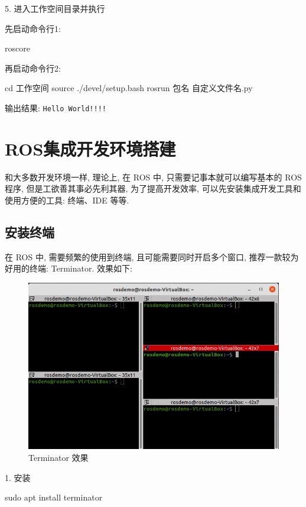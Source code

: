 \documentclass[openany, fontset=windowsold]{ctexbook}
\theoremstyle{kaiti}
\theoremstyle{normal}
\begin{document}
5. 进入工作空间目录并执行

先启动命令行1:

\begin{bash}
  roscore
\end{bash}

再启动命令行2:

\begin{bash}
  cd 工作空间
  source ./devel/setup.bash
  rosrun 包名 自定义文件名.py
\end{bash}

输出结果: \verb|Hello World!!!!|

\section{ROS集成开发环境搭建}

和大多数开发环境一样, 理论上, 在 ROS 中, 只需要记事本就可以编写基本的 ROS 程序, 但是工欲善其事必先利其器, 为了提高开发效率, 可以先安装集成开发工具和使用方便的工具: 终端、IDE 等等.

\subsection{安装终端}

在 ROS 中, 需要频繁的使用到终端, 且可能需要同时开启多个窗口, 推荐一款较为好用的终端: Terminator. 效果如下:

\begin{figure}[!ht]
  \centering
  \includegraphics[width=.9\textwidth]{terminator_illustration.png}
  \caption{Terminator 效果}
  \label{fig:ternimal_illustration}
\end{figure}

1. 安装

\begin{bash}
  sudo apt install terminator
\end{bash}
\end{document}
